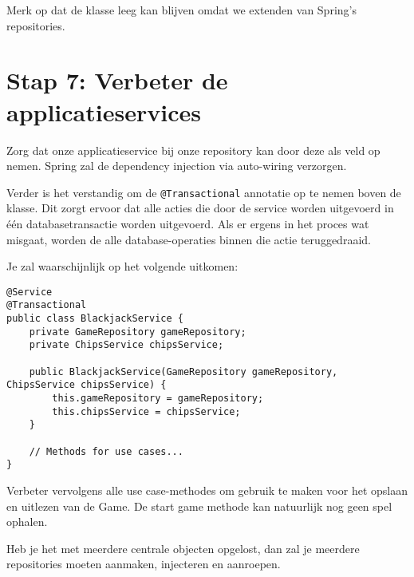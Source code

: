 Merk op dat de klasse leeg kan blijven omdat we extenden van Spring's repositories.

\section{Stap 7: Verbeter de applicatieservices}
Zorg dat onze applicatieservice bij onze repository kan door 
deze als veld op nemen. Spring zal de dependency injection via 
auto-wiring verzorgen.

Verder is het verstandig om de \texttt{@Transactional} annotatie 
op te nemen boven de klasse. Dit zorgt ervoor dat alle acties 
die door de service worden uitgevoerd in één databasetransactie 
worden uitgevoerd. Als er ergens in het proces wat misgaat, worden 
de alle database-operaties binnen die actie teruggedraaid.

Je zal waarschijnlijk op het volgende uitkomen:
\begin{verbatim}
@Service
@Transactional
public class BlackjackService {
    private GameRepository gameRepository;
    private ChipsService chipsService;

    public BlackjackService(GameRepository gameRepository, ChipsService chipsService) {
        this.gameRepository = gameRepository;
        this.chipsService = chipsService;
    }
    
    // Methods for use cases...
}
\end{verbatim}

Verbeter vervolgens alle use case-methodes om gebruik te maken voor het 
opslaan en uitlezen van de Game. De start game methode kan natuurlijk nog geen 
spel ophalen.

Heb je het met meerdere centrale objecten opgelost, 
dan zal je meerdere repositories moeten 
aanmaken, injecteren en aanroepen.